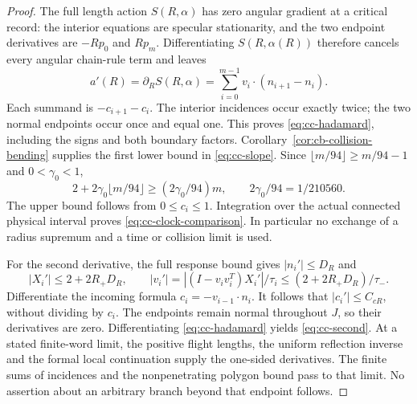 \begin{proof}
The full length action $S(R,\alpha)$ has zero angular gradient at a
critical record: the interior equations are specular stationarity,
and the two endpoint derivatives are $-Rp_0$ and $Rp_m$.
Differentiating $S(R,\alpha(R))$ therefore cancels every angular
chain-rule term and leaves
\[
 a'(R)=\partial_RS(R,\alpha)
   =\sum_{i=0}^{m-1}v_i\cdot(n_{i+1}-n_i).
\]
Each summand is $-c_{i+1}-c_i$.  The interior incidences occur exactly
twice; the two normal endpoints occur once and equal one.  This
proves \eqref{eq:cc-hadamard}, including the signs and both boundary
factors.  Corollary~\ref{cor:cb-collision-bending} supplies the first
lower bound in \eqref{eq:cc-slope}.  Since
$\lfloor m/94\rfloor\geq m/94-1$ and $0<\gamma_0<1$,
\[
 2+2\gamma_0\lfloor m/94\rfloor
 \geq (2\gamma_0/94)m,
 \qquad 2\gamma_0/94=1/210560.
\]
The upper bound follows from $0\leq c_i\leq1$.  Integration over
the actual connected physical interval proves
\eqref{eq:cc-clock-comparison}.  In particular no exchange of a
radius supremum and a time or collision limit is used.

For the second derivative, the full response bound gives
$|n_i'|\leq D_R$ and
\[
 |X_i'|\leq2+2R_+D_R,\qquad
 |v_i'|=|(I-v_iv_i^T)X_i'|/\tau_i
       \leq(2+2R_+D_R)/\tau_-.
\]
Differentiate the incoming formula $c_i=-v_{i-1}\cdot n_i$.
It follows that $|c_i'|\leq C_{cR}$, without dividing by $c_i$.
The endpoints remain normal throughout $J$, so their derivatives are
zero.  Differentiating \eqref{eq:cc-hadamard} yields
\eqref{eq:cc-second}.  At a stated finite-word limit, the positive
flight lengths, the uniform reflection inverse and the formal local
continuation supply the one-sided derivatives.  The finite sums of
incidences and the nonpenetrating polygon bound pass to that limit.
No assertion about an arbitrary branch beyond that endpoint follows.
\end{proof}

